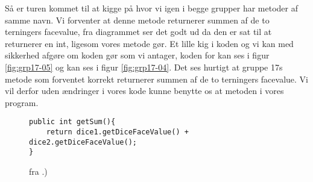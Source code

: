 Så er turen kommet til at kigge på  hvor vi igen i begge grupper har metoder af samme navn. Vi forventer at denne metode returnerer summen af de to terningers facevalue, fra diagrammet ser det godt ud da den er sat til at returnerer en int, ligesom vores metode gør. Et lille kig i koden og vi kan med sikkerhed afgøre om koden gør som vi antager, koden for  kan ses i figur \vref{fig:grp17-05} og  kan ses i figur \vref{fig:grp17-04}. Det ses hurtigt at gruppe 17s  metode som forventet korrekt returnerer summen af de to terningers facevalue. Vi vil derfor uden ændringer i vores kode kunne benytte os at  metoden i vores program.
\begin{figure}
\centering
\caption{ fra .)\cite{grp17}}\label{fig:grp17-05}
\begin{verbatim}
public int getSum(){
    return dice1.getDiceFaceValue() + dice2.getDiceFaceValue();
}
\end{verbatim}
\end{figure}

